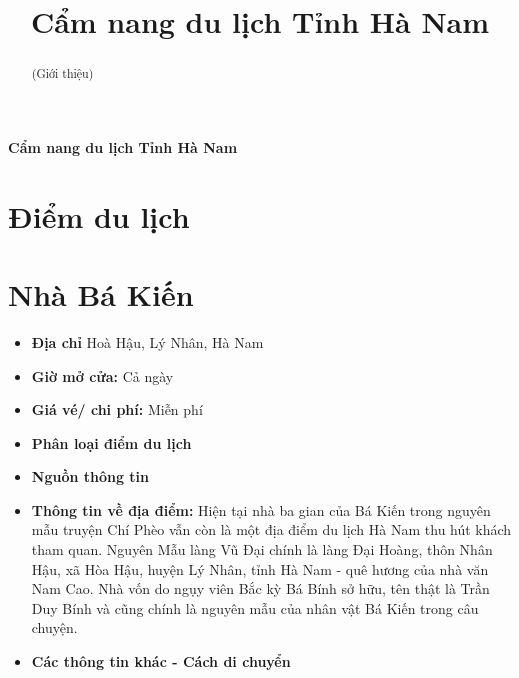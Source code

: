 \documentclass{article}
\title{Cẩm nang du lịch Tỉnh Hà Nam}
\begin{document}
\begin{center}
    \fontsize{18}{20}\textbf{Cẩm nang du lịch Tỉnh Hà Nam}
\end{center}
\begin{abstract}
    (Giới thiệu)
\end{abstract}
\section*{Điểm du lịch}

\section{Nhà Bá Kiến}
\begin{itemize}
    \item{\textbf{Địa chỉ}} Hoà Hậu, Lý Nhân, Hà Nam

    \item{\textbf{Giờ mở cửa:}} Cả ngày

    \item{\textbf{Giá vé/ chi phí:}} Miễn phí

    \item{\textbf{Phân loại điểm du lịch}} 

    \item{\textbf{Nguồn thông tin}} 

    \item{\textbf{Thông tin về địa điểm:}} Hiện tại nhà ba gian của Bá Kiến trong nguyên mẫu truyện Chí Phèo vẫn còn là một địa điểm du lịch Hà Nam thu hút khách tham quan. Nguyên Mẫu làng Vũ Đại chính là làng Đại Hoàng, thôn Nhân Hậu, xã Hòa Hậu, huyện Lý Nhân, tỉnh Hà Nam - quê hương của nhà văn Nam Cao. Nhà vốn do ngụy viên Bắc kỳ Bá Bính sở hữu, tên thật là Trần Duy Bính và cũng chính là nguyên mẫu của nhân vật Bá Kiến trong câu chuyện.
\end{itemize}

\begin{itemize}
    \item{\textbf{Các thông tin khác - Cách di chuyển}} 
\end{itemize}
\end{document}
